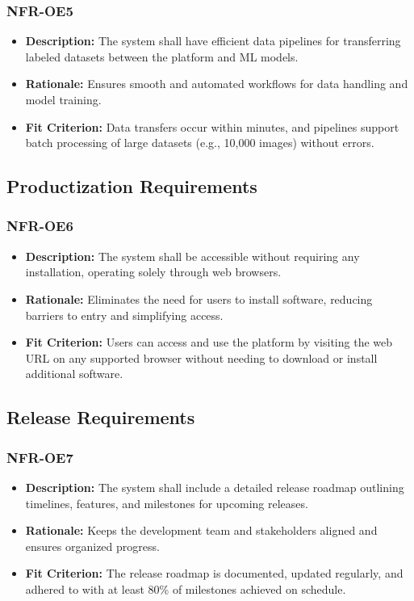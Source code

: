\documentclass[12pt]{article}
\begin{document}
\subsubsection*{NFR-OE5}
\label{sec:OE5}
\begin{itemize}
  \item \textbf{Description:} The system shall have efficient data pipelines for transferring labeled datasets between the platform and ML models.
  \item \textbf{Rationale:} Ensures smooth and automated workflows for data handling and model training.
  \item \textbf{Fit Criterion:} Data transfers occur within minutes, and pipelines support batch processing of large datasets (e.g., 10,000 images) without errors.
\end{itemize}
\subsection{Productization Requirements}
\subsubsection*{NFR-OE6}
\label{sec:OE6}
\begin{itemize}
  \item \textbf{Description:} The system shall be accessible without requiring any installation, operating solely through web browsers.
  \item \textbf{Rationale:} Eliminates the need for users to install software, reducing barriers to entry and simplifying access.
  \item \textbf{Fit Criterion:} Users can access and use the platform by visiting the web URL on any supported browser without needing to download or install additional software.
\end{itemize}
\subsection{Release Requirements}
\subsubsection*{NFR-OE7}
\label{sec:OE7}
\begin{itemize}
  \item \textbf{Description:} The system shall include a detailed release roadmap outlining timelines, features, and milestones for upcoming releases.
  \item \textbf{Rationale:} Keeps the development team and stakeholders aligned and ensures organized progress.
  \item \textbf{Fit Criterion:} The release roadmap is documented, updated regularly, and adhered to with at least 80\% of milestones achieved on schedule.
\end{itemize}
\end{document}
